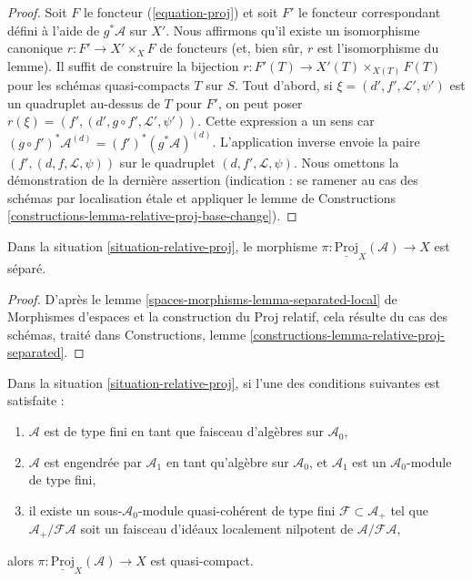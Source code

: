 \begin{proof}
Soit $F$ le foncteur (\ref{equation-proj}) et soit $F'$ le
foncteur correspondant défini à l'aide de $g^*\mathcal{A}$ sur $X'$.
Nous affirmons qu'il existe un isomorphisme canonique $r : F' \to X' \times_X F$
de foncteurs (et, bien sûr, $r$ est l'isomorphisme du lemme).
Il suffit de construire la bijection
$r : F'(T) \to X'(T) \times_{X(T)} F(T)$ pour les schémas quasi-compacts $T$
sur $S$. Tout d'abord, si $\xi = (d', f', \mathcal{L}', \psi')$ est un
quadruplet au-dessus de $T$ pour $F'$, on peut poser
$r(\xi) = (f', (d', g \circ f', \mathcal{L}', \psi'))$. Cette expression a un sens
car $(g \circ f')^*\mathcal{A}^{(d)} = (f')^*(g^*\mathcal{A})^{(d)}$.
L'application inverse envoie la paire $(f', (d, f, \mathcal{L}, \psi))$
sur le quadruplet $(d, f', \mathcal{L}, \psi)$. Nous omettons la démonstration
de la dernière assertion (indication : se ramener au cas des schémas par localisation
\'etale et appliquer le lemme de Constructions
\ref{constructions-lemma-relative-proj-base-change}).
\end{proof}

\begin{lemma}
\label{lemma-relative-proj-separated}
Dans la situation \ref{situation-relative-proj}, le morphisme
$\pi : \underline{\text{Proj}}_X(\mathcal{A}) \to X$
est séparé.
\end{lemma}

\begin{proof}
D'après le lemme \ref{spaces-morphisms-lemma-separated-local} de Morphismes d'espaces
et la construction du Proj relatif, cela résulte du
cas des schémas, traité dans
Constructions, lemme \ref{constructions-lemma-relative-proj-separated}.
\end{proof}

\begin{lemma}
\label{lemma-relative-proj-quasi-compact}
Dans la situation \ref{situation-relative-proj}, si l'une des conditions suivantes est satisfaite :
\begin{enumerate}
\item $\mathcal{A}$ est de type fini en tant que faisceau
d'algèbres sur $\mathcal{A}_0$,
\item $\mathcal{A}$ est engendrée par $\mathcal{A}_1$ en tant
qu'algèbre sur $\mathcal{A}_0$, et $\mathcal{A}_1$ est un
$\mathcal{A}_0$-module de type fini,
\item il existe un sous-$\mathcal{A}_0$-module quasi-cohérent de type fini
$\mathcal{F} \subset \mathcal{A}_{+}$ tel que
$\mathcal{A}_{+}/\mathcal{F}\mathcal{A}$ soit un faisceau d'idéaux localement nilpotent
de $\mathcal{A}/\mathcal{F}\mathcal{A}$,
\end{enumerate}
alors $\pi : \underline{\text{Proj}}_X(\mathcal{A}) \to X$ est quasi-compact.
\end{lemma}

